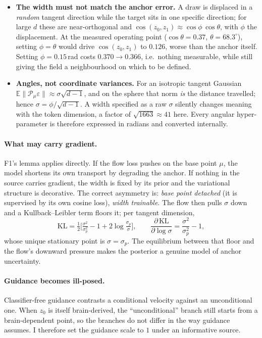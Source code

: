\documentclass[11pt,a4paper]{article}
\newcommand{\Proj}{\mathcal{P}}
\newcommand{\E}{\mathbb{E}}
\newcommand{\KL}{\mathrm{KL}}
\theoremstyle{plain}
\theoremstyle{remark}
\begin{document}
\begin{itemize}
\item \textbf{The width must not match the anchor error.} A draw is displaced in
      a \emph{random} tangent direction while the target sits in one specific
      direction; for large $d$ these are near-orthogonal and
      $\cos(z_0,z_1)\approx\cos\phi\,\cos\theta$, with $\phi$ the displacement.
      At the measured operating point ($\cos\theta=0.37$, $\theta=68.3^\circ$),
      setting $\phi=\theta$ would drive $\cos(z_0,z_1)$ to $0.126$, worse
      than the anchor itself. Setting $\phi=0.15$\,rad costs $0.370\to0.366$,
      i.e.\ nothing measurable, while still giving the field a neighbourhood on
      which to be defined.
\item \textbf{Angles, not coordinate variances.} For an isotropic tangent
      Gaussian $\E\lVert\Proj_\mu\varepsilon\rVert\approx\sigma\sqrt{d-1}$, and
      on the sphere that norm \emph{is} the distance travelled; hence
      $\sigma=\phi/\sqrt{d-1}$. A width specified as a raw $\sigma$ silently
      changes meaning with the token dimension, a factor of
      $\sqrt{1663}\approx41$ here. Every angular hyper-parameter is therefore
      expressed in radians and converted internally.
\end{itemize}

\paragraph{What may carry gradient.} F1's lemma applies directly. If the flow
loss pushes on the base point $\mu$, the model shortens its own transport by
degrading the anchor. If nothing in the source carries gradient, the width is
fixed by its prior and the variational structure is decorative. The correct
asymmetry is: \emph{base point detached} (it is supervised by its own cosine
loss), \emph{width trainable}. The flow then pulls $\sigma$ down and a
Kullback--Leibler term floors it; per tangent dimension,
\begin{equation}
\KL=\tfrac12\Big[\tfrac{\sigma^2}{\sigma_p^2}-1+2\log\tfrac{\sigma_p}{\sigma}\Big],
\qquad
\frac{\partial\,\KL}{\partial\log\sigma}=\frac{\sigma^2}{\sigma_p^2}-1,
\end{equation}
whose unique stationary point is $\sigma=\sigma_p$. The equilibrium between that
floor and the flow's downward pressure makes the posterior a genuine model of
anchor uncertainty.

\paragraph{Guidance becomes ill-posed.} Classifier-free guidance contrasts a
conditional velocity against an unconditional one. When $z_0$ is itself
brain-derived, the ``unconditional'' branch still starts from a brain-dependent
point, so the branches do not differ in the way guidance assumes. I therefore
set the guidance scale to $1$ under an informative source.
\end{document}
